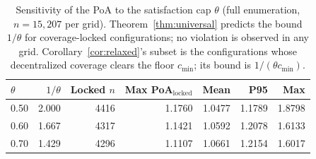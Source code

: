 \begin{table}[pos=!htbp]
\small\centering
\caption{Sensitivity of the PoA to the satisfaction cap $\theta$
 (full enumeration, $n=15{,}207$ per grid). Theorem~\ref{thm:universal}
 predicts the bound $1/\theta$ for coverage-locked configurations;
 no violation is observed in any grid. Corollary~\ref{cor:relaxed}'s
 subset is the configurations whose decentralized coverage clears the
 floor $c_{\min}$; its bound is $1/(\theta c_{\min})$.}
\label{tab:sensitivity}
\begin{tabular}{lrrrrrr}
\toprule
$\theta$ & $1/\theta$ & Locked $n$ & Max PoA$_{\mathrm{locked}}$ &
 Mean & P95 & Max \\
\midrule
0.50 & 2.000 & 4416 & 1.1760 & 1.0477 & 1.1789 & 1.8798 \\
0.60 & 1.667 & 4317 & 1.1421 & 1.0592 & 1.2078 & 1.6133 \\
0.70 & 1.429 & 4296 & 1.1107 & 1.0661 & 1.2154 & 1.6017 \\
\bottomrule
\end{tabular}
\end{table}
